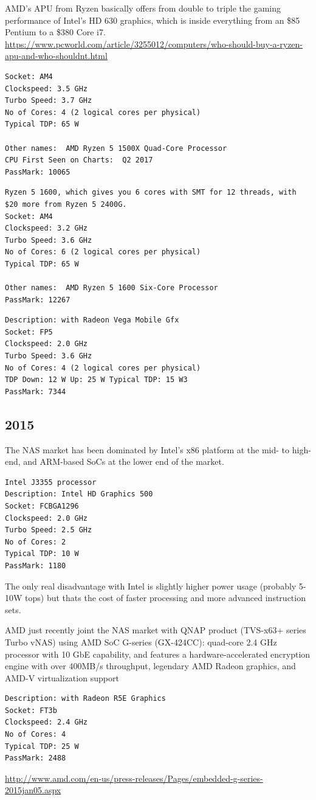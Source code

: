 AMD's APU from Ryzen basically offers from double to triple the gaming performance of
Intel's HD 630 graphics, which is inside everything from an \$85 Pentium to a
\$380 Core i7.
\url{https://www.pcworld.com/article/3255012/computers/who-should-buy-a-ryzen-apu-and-who-shouldnt.html}
\begin{verbatim}
Socket: AM4
Clockspeed: 3.5 GHz
Turbo Speed: 3.7 GHz
No of Cores: 4 (2 logical cores per physical)
Typical TDP: 65 W

Other names:  AMD Ryzen 5 1500X Quad-Core Processor
CPU First Seen on Charts:  Q2 2017
PassMark: 10065
\end{verbatim}
 

\begin{verbatim}
Ryzen 5 1600, which gives you 6 cores with SMT for 12 threads, with $20 more from Ryzen 5 2400G.
Socket: AM4
Clockspeed: 3.2 GHz
Turbo Speed: 3.6 GHz
No of Cores: 6 (2 logical cores per physical)
Typical TDP: 65 W

Other names:  AMD Ryzen 5 1600 Six-Core Processor
PassMark: 12267
\end{verbatim}


\begin{verbatim}
Description: with Radeon Vega Mobile Gfx
Socket: FP5
Clockspeed: 2.0 GHz
Turbo Speed: 3.6 GHz
No of Cores: 4 (2 logical cores per physical)
TDP Down: 12 W Up: 25 W Typical TDP: 15 W3
PassMark: 7344
\end{verbatim}


\subsection{2015}

The NAS market has been dominated by Intel's x86 platform at the mid- to
high-end, and ARM-based SoCs at the lower end of the market. 
\begin{verbatim}
Intel J3355 processor 
Description: Intel HD Graphics 500
Socket: FCBGA1296
Clockspeed: 2.0 GHz
Turbo Speed: 2.5 GHz
No of Cores: 2
Typical TDP: 10 W
PassMark: 1180 
\end{verbatim}

The only real disadvantage with Intel is slightly higher power usage (probably
5-10W tops) but thats the cost of faster processing and more advanced
instruction sets.

AMD just recently joint the NAS market with QNAP product (TVS-x63+ series Turbo
vNAS) using AMD SoC G-series (GX-424CC):
quad-core 2.4 GHz processor with 10 GbE capability, and features a
hardware-accelerated encryption engine with over 400MB/s throughput, legendary
AMD Radeon graphics, and AMD-V virtualization support
\begin{verbatim}
Description: with Radeon R5E Graphics
Socket: FT3b
Clockspeed: 2.4 GHz
No of Cores: 4
Typical TDP: 25 W
PassMark: 2488
\end{verbatim}
\url{http://www.amd.com/en-us/press-releases/Pages/embedded-g-series-2015jan05.aspx}

